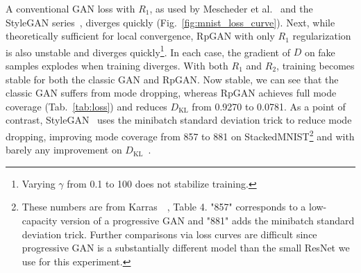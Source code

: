 A conventional GAN loss with $R_1$, as used by Mescheder et al.~\cite{r1} and the StyleGAN series~\cite{sg1, sg2, sg3}, diverges quickly (Fig.~\ref{fig:mnist_loss_curve}). Next, while theoretically sufficient for local convergence, RpGAN with only $R_1$ regularization is also unstable and diverges quickly\footnote{Varying $\gamma$ from 0.1 to 100 does not stabilize training.}. In each case, the gradient of $D$ on fake samples explodes when training diverges. With both $R_1$ and $R_2$, training becomes stable for both the classic GAN and RpGAN. Now stable, we can see that the classic GAN suffers from mode dropping, whereas RpGAN achieves full mode coverage (Tab.~\ref{tab:loss}) and reduces $D_\text{KL}$ from 0.9270 to 0.0781. As a point of contrast, StyleGAN~\cite{sg1,sg2,sg2ada,sg3} uses the minibatch standard deviation trick to reduce mode dropping, improving mode coverage from 857 to 881 on StackedMNIST\footnote{These numbers are from Karras~\etal~\cite{pggan}, Table 4. "857" corresponds to a low-capacity version of a progressive GAN and "881" adds the minibatch standard deviation trick. Further comparisons via loss curves are difficult since progressive GAN is a substantially different model than the small ResNet we use for this experiment.} and with barely any improvement on $D_\text{KL}$~\cite{pggan}.



